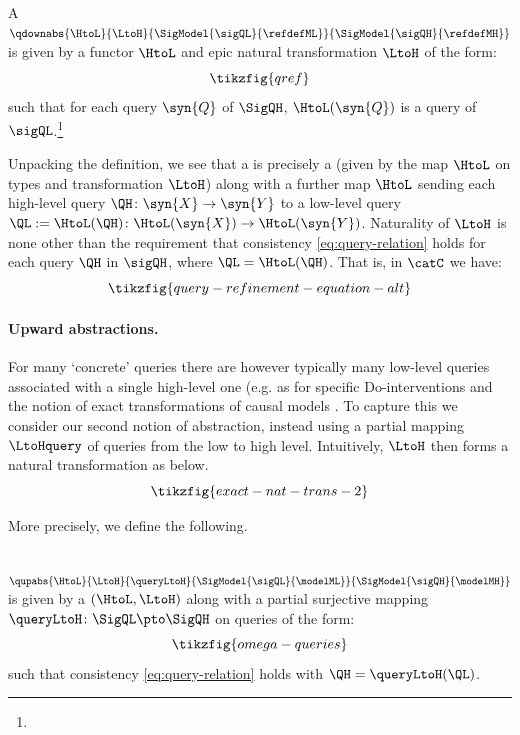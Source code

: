 \documentclass{article}
\begin{document}
\begin{definition}[\qdowncaps] \label{def:query-ref}
A \emph{\rlc{\qdownshort{}}
} $\qdownabs{\HtoL}{\LtoH}{\SigModel{\sigQL}{\refdefML}}{\SigModel{\sigQH}{\refdefMH}}$ 
is given by a functor $\HtoL$ and epic natural transformation $\LtoH$ of the form: 
\[
\tikzfig{qref}
\]
such that for each query $\syn{Q}$ of $\SigQH$, $\HtoL(\syn{Q})$ is a query of $\sigQL$.\footnote{} 
\end{definition} 

Unpacking the definition, we see that a \qdown{} is precisely a \typedown{} (given by the map $\HtoL$ on types and transformation $\LtoH$) along with a further map $\HtoL$ sending each high-level query $\QH \colon \syn{X} \to \syn{Y}$ to a low-level query $\QL := \HtoL(\QH) \colon \HtoL(\syn{X}) \to \HtoL(\syn{Y})$. Naturality of $\LtoH$ is none other than the requirement that consistency \eqref{eq:query-relation} holds for each query $\QH$ in $\sigQH$, where $\QL = \HtoL(\QH)$. That is, in $\catC$ we have: 
\[
\tikzfig{query-refinement-equation-alt}
\]

\paragraph{Upward abstractions.} 
For many `concrete' queries there are however typically many low-level queries associated with a single high-level one (e.g. as for specific Do-interventions and the notion of exact transformations of causal models . To capture this we consider our second notion of abstraction, instead using a partial mapping $\LtoHquery$ of queries from the low to high level. Intuitively, $\LtoH$ then forms a natural transformation as below. 
\begin{equation} \label{eq:exact-partial}
\tikzfig{exact-nat-trans-2}
\end{equation}

More precisely, we define the following.

\begin{definition} [\qupcaps] \label{def:up-abstraction}
\ \emph{\rlc{\qupshort{}} 
} 
$\qupabs{\HtoL}{\LtoH}{\queryLtoH}{\SigModel{\sigQL}{\modelML}}{\SigModel{\sigQH}{\modelMH}}$
is given by a \typedown{} $(\HtoL,\LtoH)$ along with a partial surjective mapping $\queryLtoH \colon \SigQL \pto \SigQH$ on queries of the form: 
\begin{equation} \label{eq:ex-trans-map}
\tikzfig{omega-queries}
\end{equation}
such that consistency \eqref{eq:query-relation} holds with $\QH = \queryLtoH(\QL)$.  
\end{definition}
\end{document}

